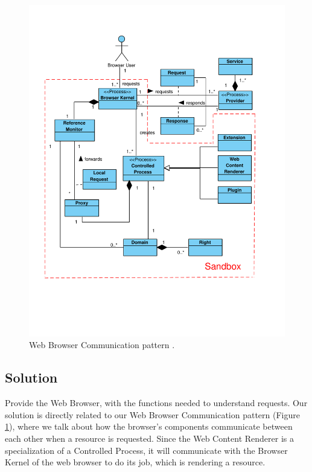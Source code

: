 \documentclass[prodmode,acmtecs]{acmsmall}
\begin{document}
    \begin{figure}[h!t]
      \vspace*{-2cm}
      \centering
      \hspace*{-0.5cm}\includegraphics[scale=0.65]{figures/BrowserInfrastructure-v3.pdf}
      \vspace*{-3cm}
      \caption{Web Browser Communication pattern \cite{silva2015}.}
      \label{fig:WBCP}
    \end{figure}

  \begin{shaded}
  \subsection*{Solution}
  Provide the Web Browser, with the functions needed to understand requests. Our solution is directly related to our Web Browser Communication pattern \cite{silva2015} (Figure \ref{fig:WBCP}), where we talk about how the browser's components communicate between each other when a resource is requested. Since the Web Content Renderer is a specialization of a Controlled Process, it will communicate with the Browser Kernel of the web browser to do its job, which is rendering a resource.

  \end{shaded}
\end{document}
